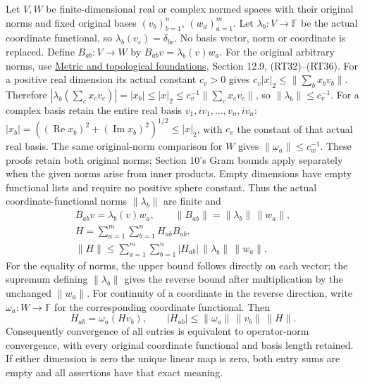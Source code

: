 \documentclass[
  11pt,
]{article}
\begin{document}
Let \(V,W\) be finite-dimensional real or complex normed spaces with
their original norms and fixed original bases \((v_b)_{b=1}^n\),
\((w_a)_{a=1}^m\). Let \(\lambda_b:V\to\mathbb F\) be the actual
coordinate functional, so \(\lambda_b(v_c)=\delta_{bc}\). No basis
vector, norm or coordinate is replaced. Define \(B_{ab}:V\to W\) by
\(B_{ab}v=\lambda_b(v)w_a\). For the original arbitrary norms, use
\href{metric-foundation-bridges.pdf}{Metric and topological foundations},
Section 12.9, (RT32)--(RT36). For a positive real dimension its actual
constant \(c_v>0\) gives \(c_v|x|_2\le\|\sum_bx_bv_b\|\). Therefore
\(|\lambda_b(\sum_cx_cv_c)|=|x_b|\le|x|_2\le c_v^{-1}\|\sum_cx_cv_c\|\),
so \(\|\lambda_b\|\le c_v^{-1}\). For a complex basis retain the entire
real basis \(v_1,iv_1,\ldots,v_n,iv_n\):
\(|x_b|=((\operatorname{Re}x_b)^2+(\operatorname{Im}x_b)^2)^{1/2}\le|x|_2\),
with \(c_v\) the constant of that actual real basis. The same
original-norm comparison for \(W\) gives \(\|\omega_a\|\le c_w^{-1}\).
These proofs retain both original norms; Section 10's Gram bounds apply
separately when the given norms arise from inner products. Empty
dimensions have empty functional lists and require no positive sphere
constant. Thus the actual coordinate-functional norms \(\|\lambda_b\|\)
are finite and \[
\begin{gathered}
B_{ab}v=\lambda_b(v)w_a,\qquad \|B_{ab}\|=\|\lambda_b\|\,\|w_a\|,\\
H=\sum_{a=1}^m\sum_{b=1}^n H_{ab}B_{ab},\\
\|H\|\leq\sum_{a=1}^m\sum_{b=1}^n |H_{ab}|\,\|\lambda_b\|\,\|w_a\|.
\end{gathered}
\tag{MD1}
\] For the equality of norms, the upper bound follows directly on each
vector; the supremum defining \(\|\lambda_b\|\) gives the reverse bound
after multiplication by the unchanged \(\|w_a\|\). For continuity of a
coordinate in the reverse direction, write \(\omega_a:W\to\mathbb F\)
for the corresponding coordinate functional. Then \[
 H_{ab}=\omega_a(Hv_b),\qquad
 |H_{ab}|\leq\|\omega_a\|\,\|v_b\|\,\|H\|.
\tag{MD2}
\] Consequently convergence of all entries is equivalent to
operator-norm convergence, with every original coordinate functional and
basis length retained. If either dimension is zero the unique linear map
is zero, both entry sums are empty and all assertions have that exact
meaning.
\end{document}
